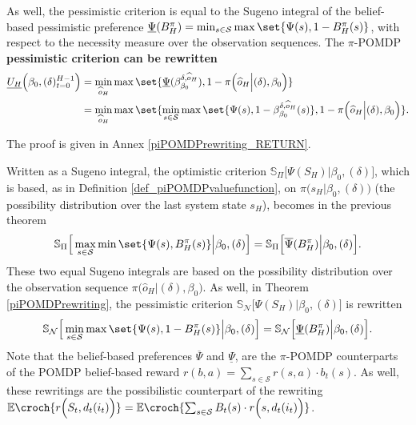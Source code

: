 \begin{theorem}
As well, the pessimistic criterion is equal to the Sugeno integral of the belief-based pessimistic preference
$\underline{\Psi}(B^{\pi}_H) = \min_{s \in \mathcal{S}} \max \set{ \Psi(s), 1 - B^{\pi}_H(s) }$,
with respect to the necessity measure over the observation sequences.
The $\pi$-POMDP \textbf{pessimistic criterion can be rewritten}
\begin{align}
\label{piPOMDPpessrewriting}
\underline{U_H}\Big(\beta_0,(\delta)_{t=0}^{H-1}\Big) &= \min_{\widehat{o}_H} \max \set{ \underline{\Psi}(\beta^{\delta,\widehat{o}_H}_{\beta_0}), 1-\pi \Big( \widehat{o}_H \Big\vert (\delta), \beta_0 \Big) } \\
\nonumber &= \min_{\widehat{o}_H} \max \set{  \min_{s \in \mathcal{S}} \max \set{ \Psi(s), 1 - \beta^{\delta,\widehat{o}_H}_{\beta_0}(s) }, 1-\pi \Big( \widehat{o}_H \Big\vert (\delta), \beta_0 \Big) }.
\end{align}
\end{theorem}
The proof is given in Annex \ref{piPOMDPrewriting_RETURN}.

Written as a Sugeno integral, the optimistic criterion $\mathbb{S}_{\Pi} \Big[ \Psi(S_H) \Big\vert \beta_0, (\delta) \Big]$,
which is based, as in Definition \ref{def_piPOMDPvaluefunction}, on $\pi \Big( s_H \Big\vert \beta_0, (\delta) \Big)$ (the possibility distribution over the last system state $s_H$), 
becomes in the previous theorem
\[  \mathbb{S}_{\Pi} \Big[ \max_{s \in \mathcal{S}} \min \set{\Psi(s), B^{\pi}_H(s)  } \Big\vert \beta_0, (\delta) \Big] = \mathbb{S}_{\Pi} \Big[ \overline{\Psi}(B^{\pi}_H) \Big\vert \beta_0, (\delta) \Big]. \]
These two equal Sugeno integrals are based on the possibility distribution 
over the observation sequence $\pi \Big( \widehat{o}_H \Big\vert (\delta), \beta_0 \Big)$.
As well, in Theorem \ref{piPOMDPrewriting}, 
the pessimistic criterion $\mathbb{S}_{\mathcal{N}} \Big[ \Psi(S_H) \Big\vert \beta_0, (\delta) \Big]$
is rewritten 
\[  \mathbb{S}_{\mathcal{N}} \Big[ \min_{s \in \mathcal{S}} \max \set{\Psi(s), 1 - B^{\pi}_H(s)  } \Big\vert \beta_0, (\delta) \Big] 
= \mathbb{S}_{\mathcal{N}} \Big[ \underline{\Psi}(B^{\pi}_H) \Big\vert \beta_0, (\delta) \Big]. \]
Note that the belief-based preferences $\overline{\Psi}$ and $\underline{\Psi}$,
are the $\pi$-POMDP counterparts of the POMDP belief-based reward $r(b,a) = \sum_{s \in \mathcal{S}} r(s,a) \cdot b_t(s)$.
As well, these rewritings are the possibilistic counterpart of 
the rewriting $\mathbb{E} \croch{ r\Big(S_t, d_t(i_t) \Big) } = \mathbb{E} \croch{ \sum_{s \in \mathcal{S}} B_t(s) \cdot r\Big(s,d_t(i_t)\Big) }$.

